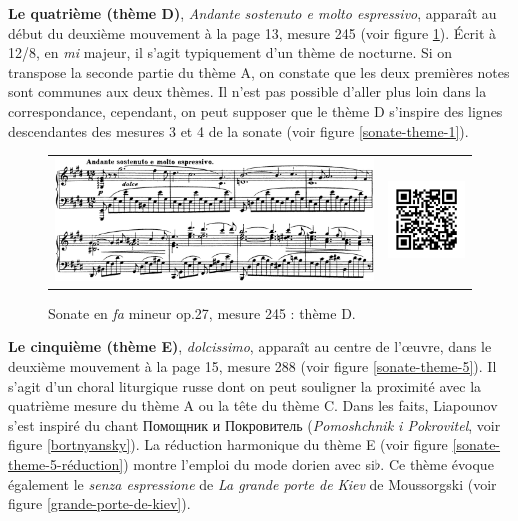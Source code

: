 \textbf{Le quatrième (thème D)}, \emph{Andante sostenuto e molto espressivo}, apparaît au début du deuxième mouvement à la page 13, mesure 245 (voir figure \ref{sonate-theme-4}). Écrit à 12/8, en \emph{mi} majeur, il s'agit typiquement d'un thème de nocturne. Si on transpose la seconde partie du thème A, on constate que les deux premières notes sont communes aux deux thèmes. Il n'est pas possible d'aller plus loin dans la correspondance, cependant, on peut supposer que le thème D s'inspire des lignes descendantes des mesures 3 et 4 de la sonate (voir figure \ref{sonate-theme-1}).

\begin{figure}[!ht]
  \begin{bigcenter}
    \begin{tabular}{lr}
      \includegraphics[width=12.5cm, keepaspectratio]{sonate-theme-D.png}
      &
      \includegraphics[width=3cm, keepaspectratio]{op1-qr.png}
    \end{tabular}
  \end{bigcenter}
  \caption{\label{sonate-theme-4}Sonate en \emph{fa} mineur op.27, mesure 245 : thème D.}
\end{figure}

\textbf{Le cinquième (thème E)}, \emph{dolcissimo},  apparaît au centre de l'œuvre, dans le deuxième mouvement à la page 15, mesure 288 (voir figure \ref{sonate-theme-5}). Il s'agit d'un choral liturgique russe dont on peut souligner la proximité avec la quatrième mesure du thème A ou la tête du thème C. Dans les faits, Liapounov s'est inspiré du chant \foreignlanguage{russian}{Помощник и Покровитель} (\emph{Pomoshchnik i Pokrovitel}, voir figure \ref{bortnyansky})\cite{1}. La réduction harmonique du thème E (voir figure \ref{sonate-theme-5-réduction}) montre l'emploi du mode dorien avec si$\flat$. Ce thème évoque également le \emph{senza espressione} de \emph{La grande porte de Kiev} de Moussorgski (voir figure \ref{grande-porte-de-kiev}).\\

